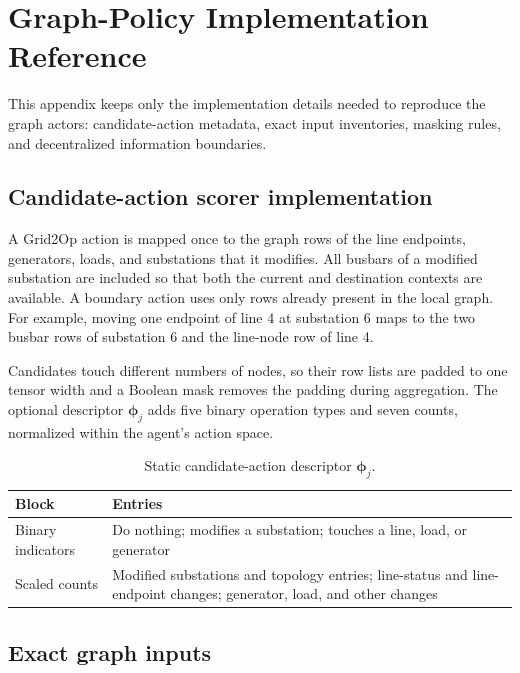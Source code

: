 \chapter{Graph-Policy Implementation Reference}
\label{app:gine-architecture}

This appendix keeps only the implementation details needed to reproduce the
graph actors: candidate-action metadata, exact input inventories, masking
rules, and decentralized information boundaries.

\section{Candidate-action scorer implementation}
\label{app:candidate-scorer-details}

A Grid2Op action is mapped once to the graph rows of the line endpoints,
generators, loads, and substations that it modifies. All busbars of a modified
substation are included so that both the current and destination contexts are
available. A boundary action uses only rows already present in the local graph.
For example, moving one endpoint of line 4 at substation 6 maps to the two
busbar rows of substation 6 and the line-node row of line 4.

Candidates touch different numbers of nodes, so their row lists are padded to
one tensor width and a Boolean mask removes the padding during aggregation.
The optional descriptor $\boldsymbol\phi_j$ adds five binary operation types
and seven counts, normalized within the agent's action space.

\begin{table}[H]
  \centering
  \small
  \caption{Static candidate-action descriptor $\boldsymbol\phi_j$.}
  \label{tab:candidate-action-features}
  \label{tab:candidate-metadata-example}
  \setlength{\tabcolsep}{5pt}
  \begin{tabular}{L{0.27\textwidth}L{0.63\textwidth}}
    \toprule
    Block & Entries \\
    \midrule
    Binary indicators & Do nothing; modifies a substation; touches a line,
      load, or generator \\
    Scaled counts & Modified substations and topology entries; line-status and
      line-endpoint changes; generator, load, and other changes \\
    \bottomrule
  \end{tabular}
\end{table}

\section{Exact graph inputs}

